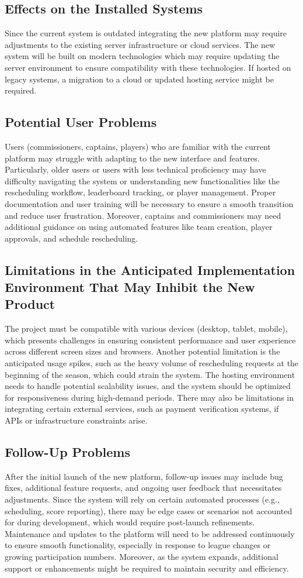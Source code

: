 \documentclass[12pt, titlepage]{article}
\begin{document}
\subsection{Effects on the Installed Systems}
Since the current system is outdated integrating the new platform may require adjustments to the existing server infrastructure or cloud services. The new system will be built on modern technologies which may require updating the server environment to ensure compatibility with these technologies. If hosted on legacy systems, a migration to a cloud or updated hosting service might be required.
\subsection{Potential User Problems}
Users (commissioners, captains, players) who are familiar with the current platform may struggle with adapting to the new interface and features. Particularly, older users or users with less technical proficiency may have difficulty navigating the system or understanding new functionalities like the rescheduling workflow, leaderboard tracking, or player management. Proper documentation and user training will be necessary to ensure a smooth transition and reduce user frustration. Moreover, captains and commissioners may need additional guidance on using automated features like team creation, player approvals, and schedule rescheduling.
\subsection{Limitations in the Anticipated Implementation Environment That May
Inhibit the New Product}
The project must be compatible with various devices (desktop, tablet, mobile), which presents challenges in ensuring consistent performance and user experience across different screen sizes and browsers. Another potential limitation is the anticipated usage spikes, such as the heavy volume of rescheduling requests at the beginning of the season, which could strain the system. The hosting environment needs to handle potential scalability issues, and the system should be optimized for responsiveness during high-demand periods. There may also be limitations in integrating certain external services, such as payment verification systems, if APIs or infrastructure constraints arise.
\subsection{Follow-Up Problems}
After the initial launch of the new platform, follow-up issues may include bug fixes, additional feature requests, and ongoing user feedback that necessitates adjustments. Since the system will rely on certain automated processes (e.g., scheduling, score reporting), there may be edge cases or scenarios not accounted for during development, which would require post-launch refinements. Maintenance and updates to the platform will need to be addressed continuously to ensure smooth functionality, especially in response to league changes or growing participation numbers. Moreover, as the system expands, additional support or enhancements might be required to maintain security and efficiency.
\end{document}
